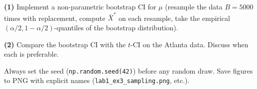 \documentclass[a4paper,11pt]{article}
\begin{document}
\begin{exercise}
\textbf{(1)} Implement a non-parametric bootstrap CI for $\mu$ (resample
the data $B = 5000$ times with replacement, compute $\bar X^*$ on each
resample, take the empirical $(\alpha/2, 1 - \alpha/2)$-quantiles of
the bootstrap distribution).

\textbf{(2)} Compare the bootstrap CI with the $t$-CI on the Atlanta
data. Discuss when each is preferable.
\end{exercise}

\bigskip
\begin{warning}
Always set the seed (\texttt{np.random.seed(42)}) before any random
draw. Save figures to PNG with explicit names
(\texttt{lab1\_ex3\_sampling.png}, etc.).
\end{warning}
\end{document}
